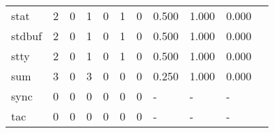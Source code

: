 \begin{longtable}{lp{1.2cm}p{1.2cm}p{1.2cm}p{1.2cm}p{1.2cm}p{1.2cm}p{1.2cm}p{1.2cm}p{1.2cm}p{1.2cm}}
stat      &                                     2 &                                                  0 &                                                1 &                                               0 &                                                1 &                                              0 &                                         0.500 &                                              1.000 &                                              0.000 \\
stdbuf    &                                     2 &                                                  0 &                                                1 &                                               0 &                                                1 &                                              0 &                                         0.500 &                                              1.000 &                                              0.000 \\
stty      &                                     2 &                                                  0 &                                                1 &                                               0 &                                                1 &                                              0 &                                         0.500 &                                              1.000 &                                              0.000 \\
sum       &                                     3 &                                                  0 &                                                3 &                                               0 &                                                0 &                                              0 &                                         0.250 &                                              1.000 &                                              0.000 \\
sync      &                                     0 &                                                  0 &                                                0 &                                               0 &                                                0 &                                              0 &                                             - &                                                  - &                                                  - \\
tac       &                                     0 &                                                  0 &                                                0 &                                               0 &                                                0 &                                              0 &                                             - &                                                  - &                                                  - \\

\end{longtable}
